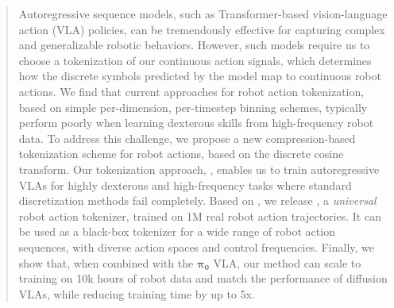 
\begin{abstract}

Autoregressive sequence models, such as Transformer-based vision-language action (VLA) policies, can be tremendously effective for capturing complex and generalizable robotic behaviors. 
However, such models require us to choose a tokenization of our continuous action signals, which determines how the discrete symbols predicted by the model map to continuous robot actions.
We find that current approaches for robot action tokenization, based on simple per-dimension, per-timestep binning schemes, typically perform poorly when learning dexterous skills from high-frequency robot data. 
To address this challenge, we propose a new compression-based tokenization scheme for robot actions, based on the discrete cosine transform. Our tokenization approach, \ModelAcronymLong, enables us to train autoregressive VLAs for highly dexterous and high-frequency tasks where standard discretization methods fail completely. Based on \ModelAcronym{}, we release \ModelUniversalAcronym, a \emph{universal} robot action tokenizer, trained on 1M real robot action trajectories. It can be used as a black-box tokenizer for a wide range of robot action sequences, with diverse action spaces and control frequencies. Finally, we show that, when combined with the $\bm{\pi_0}$ VLA, our method can scale to training on 10k hours of robot data and match the performance of diffusion VLAs, while reducing training time by up to 5x.

\end{abstract}

